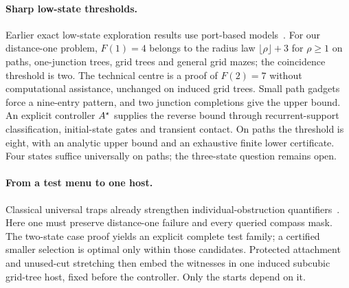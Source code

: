 \paragraph{Sharp low-state thresholds.}
Earlier exact low-state exploration results use port-based
models~\cite{FraigniaudIlcinkasPelc2008}. For our distance-one problem,
$F(1)=4$ belongs to the radius law $\lfloor\rho\rfloor+3$ for $\rho\ge1$ on paths,
one-junction trees, grid trees and general grid mazes; the coincidence threshold
is two. The technical centre is a proof of $F(2)=7$ without computational
assistance, unchanged on induced grid trees. Small path gadgets force a nine-entry
pattern, and two junction completions give the upper bound. An explicit controller
$A^{\star}$ supplies the reverse bound through recurrent-support classification,
initial-state gates and transient contact. On paths the threshold is eight, with
an analytic upper bound and an exhaustive finite lower certificate. Four states
suffice universally on paths; the three-state question remains open.

\paragraph{From a test menu to one host.}
Classical universal traps already strengthen individual-obstruction
quantifiers~\cite{AntelmannBudachRollik1979,KilibardaReduction2021}.
Here one must preserve distance-one failure and every queried compass mask.
The two-state case proof yields an explicit complete test family; a certified
smaller selection is optimal only within those candidates. Protected attachment
and unused-cut stretching then embed the witnesses in one induced subcubic
grid-tree host, fixed before the controller. Only the starts depend on it.

